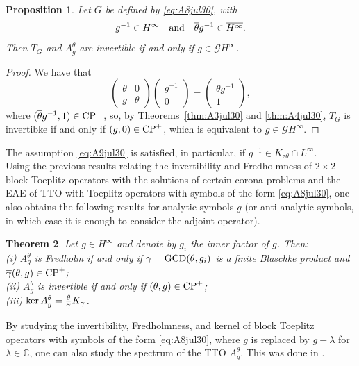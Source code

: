 \documentclass[11pt]{article}
\newtheorem{thm}{Theorem}[section]
\newtheorem{prop}[thm]{Proposition}
\def\CC{\mathbb C}
\def\G{\mathcal G}
\def\beginpf{\begin{proof}}
\def\beq{\begin{equation}}
\def\eeq{\end{equation}}
\def\ol{\overline}
\def\ker{\mathop{\rm ker}\nolimits}
\def\CP{{\rm CP}}
\def\GCD{{\rm GCD}}
\begin{document}
\begin{prop}\label{prop:A5aug3}
Let $G$ be defined by \eqref{eq:A8jul30}, with 
\beq\label{eq:A9jul30}
g^{-1} \in H^\infty  \quad \hbox{and} \quad \ol\theta g^{-1} \in \ol{H^\infty}.
\eeq
Then $T_G$ and $A^\theta_g$ are invertible if and only if $g \in \G H^\infty$.
\end{prop}
\beginpf
We have that
\[
\begin{pmatrix}
\ol\theta & 0 \\ g & \theta
\end{pmatrix}
\begin{pmatrix}
g^{-1} \\ 0 
\end{pmatrix} =\begin{pmatrix}
\ol\theta g^{-1} \\ 1 
\end{pmatrix},
\]
where $(\ol\theta g^{-1},1) \in \CP^-$, so, by Theorems~\ref{thm:A3jul30}
and \ref{thm:A4jul30}, $T_G$ is invertibke if and only if $(g,0) \in \CP^+$, which is
equivalent to $g \in \G H^\infty$.
\end{proof}

The assumption \eqref{eq:A9jul30} is satisfied, in particular, if
$g^{-1} \in K_{z\theta} \cap L^\infty$.\\

Using the previous results relating the invertibility and Fredholmness of $2 \times 2$ block Toeplitz operators with the solutions of
certain corona problems and the EAE of TTO with Toeplitz operators with symbols
of the form \eqref{eq:A8jul30}, one also obtains the following results for analytic symbols $g$ 
(or anti-analytic symbols, in which case it is enough to consider the adjoint operator).

\begin{thm}\label{thm:A6aug3}
Let $g \in H^\infty$ and denote by $g_i$ the inner factor of $g$. Then:
\\
(i) $A^\theta_g$ is Fredholm if and only if $\gamma=\GCD(\theta,g_i)$ is
a finite Blaschke product and $\ol\gamma(\theta,g) \in \CP^+$;
\\
(ii) $A^\theta_g$ is invertible if and only if $(\theta,g) \in \CP^+$;
\\
(iii) $\ker A^\theta_g = \frac{\theta}{\gamma} K_\gamma$.
\end{thm}

By studying the invertibility, Fredholmness, and kernel of block Toeplitz operators with symbols of the form \eqref{eq:A8jul30}, where $g$ is replaced by $g-\lambda$ for $\lambda\in \CC$,
one can also study the spectrum of the TTO $A^\theta_g$. This was done in
\cite{CP16}.\\
\end{document}
